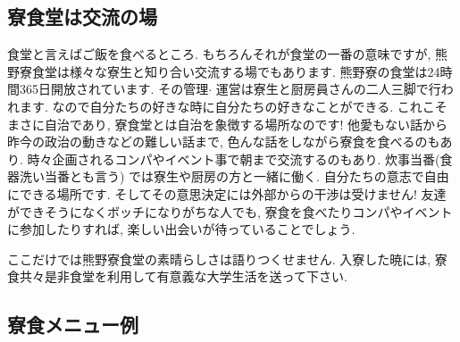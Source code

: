 \documentclass[10pt,b5jsbook,dvips,dvipdfmx,openany]{jsbook}
\theoremstyle{definition}
\begin{document}
		\subsection{寮食堂は交流の場}
		食堂と言えばご飯を食べるところ. もちろんそれが食堂の一番の意味ですが, 熊野寮食堂は様々な寮生と知り合い交流する場でもあります. 熊野寮の食堂は24時間365日開放されています. その管理$ \cdot $ 運営は寮生と厨房員さんの二人三脚で行われます. なので自分たちの好きな時に自分たちの好きなことができる. これこそまさに自治であり, 寮食堂とは自治を象徴する場所なのです! 他愛もない話から昨今の政治の動きなどの難しい話まで, 色んな話をしながら寮食を食べるのもあり. 時々企画されるコンパやイベント事で朝まで交流するのもあり. 炊事当番(食器洗い当番とも言う) では寮生や厨房の方と一緒に働く. 自分たちの意志で自由にできる場所です. そしてその意思決定には外部からの干渉は受けません! 友達ができそうになくボッチになりがちな人でも, 寮食を食べたりコンパやイベントに参加したりすれば, 楽しい出会いが待っていることでしょう.

		ここだけでは熊野寮食堂の素晴らしさは語りつくせません. 入寮した暁には, 寮食共々是非食堂を利用して有意義な大学生活を送って下さい.

		\subsection{寮食メニュー例}
\end{document}
